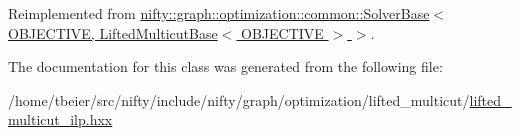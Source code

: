 Reimplemented from \hyperlink{classnifty_1_1graph_1_1optimization_1_1common_1_1SolverBase_a8ab38d61068370e24cca475ef1b5d8b1}{nifty\+::graph\+::optimization\+::common\+::\+Solver\+Base$<$ O\+B\+J\+E\+C\+T\+I\+V\+E, Lifted\+Multicut\+Base$<$ O\+B\+J\+E\+C\+T\+I\+V\+E $>$ $>$}.



The documentation for this class was generated from the following file\+:\begin{DoxyCompactItemize}
\item 
/home/tbeier/src/nifty/include/nifty/graph/optimization/lifted\+\_\+multicut/\hyperlink{lifted__multicut__ilp_8hxx}{lifted\+\_\+multicut\+\_\+ilp.\+hxx}\end{DoxyCompactItemize}
